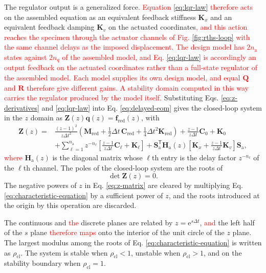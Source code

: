 \documentclass[11pt,a4paper]{article}
\numberwithin{equation}{section}
\newcommand{\rev}[1]{\textcolor{red}{#1}}
\begin{document}
The regulator output is a generalized force\rev{. Equation \eqref{eq:lqr-law} therefore acts} on the assembled equation as an equivalent feedback stiffness \(\mathbf{K}_{x}\) and an equivalent feedback damping \(\mathbf{K}_{v}\) on the actuated coordinates\rev{, and this action reaches the specimen through the actuator channels of Fig. \ref{fig:rths-loop} with the same channel delays as the imposed displacement. The design model has \(2n_{\mathrm{a}}\) states against \(2n_{q}\) of the assembled model, and Eq. \eqref{eq:lqr-law} is accordingly an output feedback on the actuated coordinates rather than a full-state regulator of the assembled model. Each model supplies its own design model, and equal \(\mathbf{Q}\) and \(\mathbf{R}\) therefore give different gains. A stability domain computed in this way carries the regulator produced by the model itself.}
Substituting Eqs. \eqref{eq:z-derivatives} and \eqref{eq:lqr-law} into Eq. \eqref{eq:delayed-eom} gives the closed-loop system in the \(z\) domain as \(\mathbf{Z}(z)\bm{q}(z)=\bm{f}_{\mathrm{red}}(z)\), with
\begin{equation}
	\begin{aligned}
		\mathbf{Z}(z)={}&
		\frac{(z-1)^{2}}{z\Delta t^{2}}
		\left(\mathbf{M}_{\mathrm{red}}
		+\tfrac{1}{2}\Delta t\,\mathbf{C}_{\mathrm{red}}
		+\tfrac{1}{4}\Delta t^{2}\mathbf{K}_{\mathrm{red}}\right)
		+\frac{z-1}{z\Delta t}\mathbf{C}_{0}+\mathbf{K}_{0}\\
		&+\sum_{\ell=1}^{n_{\mathrm{a}}}z^{-n_{\ell}}
		\left[
		\frac{z-1}{z\Delta t}\mathbf{C}_{\ell}+\mathbf{K}_{\ell}
		\right]
		+\mathbf{S}_{\mathrm{a}}^{\mathsf{T}}\mathbf{H}_{\mathrm{a}}(z)
		\left[
		\mathbf{K}_{x}+\frac{z-1}{z\Delta t}\mathbf{K}_{v}
		\right]\mathbf{S}_{\mathrm{a}},
	\end{aligned}
	\label{eq:z-matrix}
\end{equation}
\rev{where} \(\mathbf{H}_{\mathrm{a}}(z)\) is the diagonal matrix whose \(\ell\)th entry is the delay factor \(z^{-n_{\ell}}\) of the \(\ell\)th channel. The poles of the closed-loop system are the roots of
\begin{equation}
	\det\mathbf{Z}(z)=0.
	\label{eq:characteristic-equation}
\end{equation}
The negative powers of \(z\) in Eq. \eqref{eq:z-matrix} are cleared by multiplying Eq. \eqref{eq:characteristic-equation} by a sufficient power of \(z\), and the roots introduced at the origin by this operation are discarded.

The continuous and \rev{the} discrete planes are related by \(z=\mathrm{e}^{s\Delta t}\), \rev{and} the left half of the \(s\) plane \rev{therefore maps} onto the interior of the unit circle of the \(z\) plane. The largest modulus among the roots of Eq. \eqref{eq:characteristic-equation} is written as \(\rho_{\mathrm{cl}}\). The system is stable when \(\rho_{\mathrm{cl}}<1\), unstable when \(\rho_{\mathrm{cl}}>1\), and on the stability boundary when \(\rho_{\mathrm{cl}}=1\).
\end{document}
